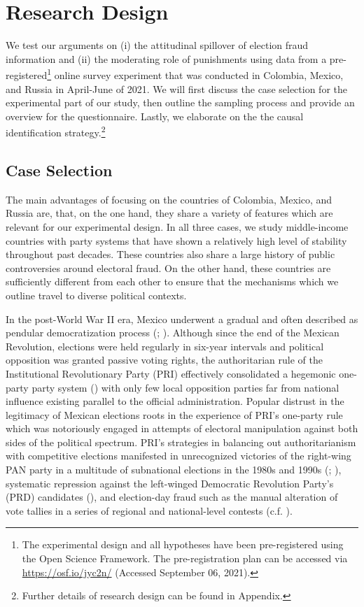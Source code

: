 \documentclass[11pt, ngerman,english,a4]{article}
\begin{document}
\section*{Research Design}

 
We test our arguments on (i) the attitudinal spillover of election fraud information and (ii) the moderating role of punishments using data from a pre-registered\footnote{The experimental design and all hypotheses have been pre-registered using the Open Science Framework. The pre-registration plan can be accessed via \url{https://osf.io/jyc2n/} (Accessed September 06, 2021).} online survey experiment that was conducted in Colombia, Mexico, and Russia in April-June of 2021. We will first discuss the case selection for the experimental part of our study, then outline the sampling process and provide an overview for the questionnaire. Lastly, we elaborate on the the causal identification strategy.\footnote{Further details of research design can be found in Appendix.}


\subsection*{Case Selection}

The main advantages of focusing on the countries of Colombia, Mexico, and Russia are, that, on the one hand, they share a variety of features which are relevant for our experimental design. In all three cases, we study middle-income countries with party systems that have shown a relatively high level of stability throughout past decades. These countries also share a large history of public controversies around electoral fraud. On the other hand, these countries are sufficiently different from each other to ensure that the mechanisms which we outline travel to diverse political contexts. 

In the post-World War II era, Mexico underwent a gradual and often described as pendular democratization process (\citealt{Cantu2015}; \citealt{Hiskey2005}). Although since the end of the Mexican Revolution, elections were held regularly in six-year intervals and political opposition was granted passive voting rights, the authoritarian rule of the Institutional Revolutionary Party (PRI) effectively consolidated a hegemonic one-party party system (\citealt{Sartori1976}) with only few local opposition parties far from national influence existing parallel to the official administration. Popular distrust in the legitimacy of Mexican elections roots in the experience of PRI's one-party rule which was notoriously engaged in attempts of electoral manipulation against both sides of the political spectrum. PRI's strategies in balancing out authoritarianism with competitive elections manifested in unrecognized victories of the right-wing PAN party in a multitude of subnational elections in the 1980s and 1990s (\citealt{Greene2007}; \citealt{Cantu2015}), systematic repression against the left-winged Democratic Revolution Party's (PRD) candidates (\citealt{Greene2007}), and election-day fraud such as the manual alteration of vote tallies in a series of regional and national-level contests (c.f. \citealt{Cantu2019b}).
\end{document}
